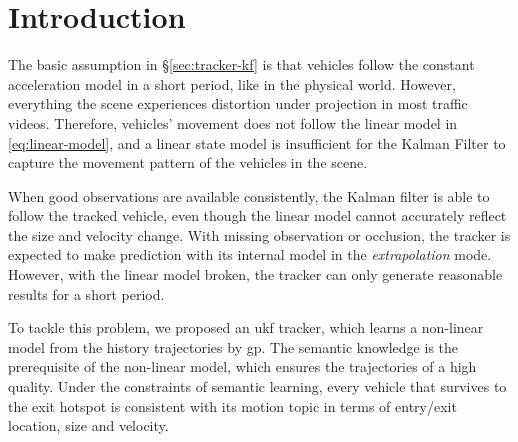 \section{Introduction}
\label{sec:gp-ukf-intro}

The basic assumption in \S\ref{sec:tracker-kf} is that vehicles follow the constant acceleration model in a short period, like in the physical world.
However, everything the scene experiences distortion under projection in most traffic videos. Therefore, vehicles' movement does not follow the linear model in \ref{eq:linear-model}, and a linear state model is insufficient for the Kalman Filter to capture the movement pattern of the vehicles in the scene.

When good observations are available consistently, the Kalman filter is able to follow the tracked vehicle, even though the linear model cannot accurately reflect the size and velocity change. 
With missing observation or occlusion, the tracker is expected to make prediction with its internal model in the \emph{extrapolation} mode. 
However, with the linear model broken, the tracker can only generate reasonable results for a short period.

To tackle this problem, we proposed an \gls{ukf} tracker, which learns a non-linear model from the history trajectories by \gls{gp}. 
The semantic knowledge is the prerequisite of the non-linear model, which ensures the trajectories of a high quality.
Under the constraints of semantic learning, every vehicle that survives to the exit hotspot is consistent with its motion topic in terms of entry/exit location, size and velocity.
